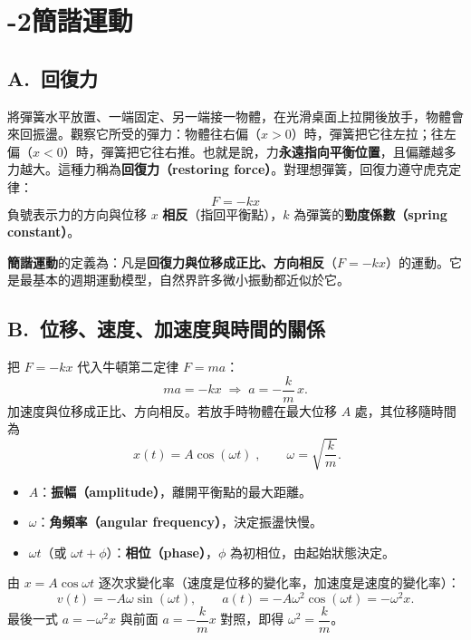\documentclass[11pt]{article}
\begin{document}
\section*{-2\quad 簡諧運動}

\subsection*{\sffamily A.\ 回復力}

將彈簧水平放置、一端固定、另一端接一物體，在光滑桌面上拉開後放手，物體會來回振盪。觀察它所受的彈力：物體往右偏（$x>0$）時，彈簧把它往左拉；往左偏（$x<0$）時，彈簧把它往右推。也就是說，力\textbf{永遠指向平衡位置}，且偏離越多力越大。這種力稱為\textbf{回復力（restoring force）}。對理想彈簧，回復力遵守虎克定律：
$$\boxed{\;F=-kx\;}$$
負號表示力的方向與位移 $x$ \textbf{相反}（指回平衡點），$k$ 為彈簧的\textbf{勁度係數（spring constant）}。


\textbf{簡諧運動}的定義為：凡是\textbf{回復力與位移成正比、方向相反}（$F=-kx$）的運動。它是最基本的週期運動模型，自然界許多微小振動都近似於它。

\subsection*{\sffamily B.\ 位移、速度、加速度與時間的關係}

把 $F=-kx$ 代入牛頓第二定律 $F=ma$：
$$ma=-kx \;\Rightarrow\; a=-\frac{k}{m}\,x.$$
加速度與位移成正比、方向相反。若放手時物體在最大位移 $A$ 處，其位移隨時間為
$$\boxed{\;x(t)=A\cos(\omega t)\;},\qquad \omega=\sqrt{\frac{k}{m}}.$$
\begin{itemize}\setlength{\itemsep}{1pt}
\item $A$：\textbf{振幅（amplitude）}，離開平衡點的最大距離。
\item $\omega$：\textbf{角頻率（angular frequency）}，決定振盪快慢。
\item $\omega t$（或 $\omega t+\phi$）：\textbf{相位（phase）}，$\phi$ 為初相位，由起始狀態決定。
\end{itemize}

由 $x=A\cos\omega t$ 逐次求變化率（速度是位移的變化率，加速度是速度的變化率）：
$$v(t)=-A\omega\sin(\omega t),\qquad a(t)=-A\omega^2\cos(\omega t)=-\omega^2 x.$$
最後一式 $a=-\omega^2 x$ 與前面 $a=-\dfrac{k}{m}x$ 對照，即得 $\omega^2=\dfrac{k}{m}$。
\end{document}
